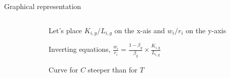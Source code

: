 \documentclass[notes,11pt, aspectratio=169, xcolor=table]{beamer}
\newenvironment{wideitemize}{\itemize\addtolength{\itemsep}{10pt}}{\enditemize}
\begin{document}
\begin{frame}{Graphical representation}
\begin{columns}[T]
\begin{column}{.5\textwidth}
\begin{tikzpicture}
    \end{tikzpicture}

                
    \end{column}
    \begin{column}{.5\textwidth}

    \begin{wideitemize}
        \item Let's place $K_{i,g}/L_{i,g}$ on the x-ais and $w_i/r_i$ on the y-axis

    \item Inverting equations, $\frac{w_i}{r_i} = \frac{1-\beta_g}{\beta_g} \times \frac{K_{i,g}}{L_{i,g}}$

    \item Curve for $C$ steeper than for $T$
    \end{wideitemize}


    \end{column}
\end{columns}
\end{frame}
\end{document}
